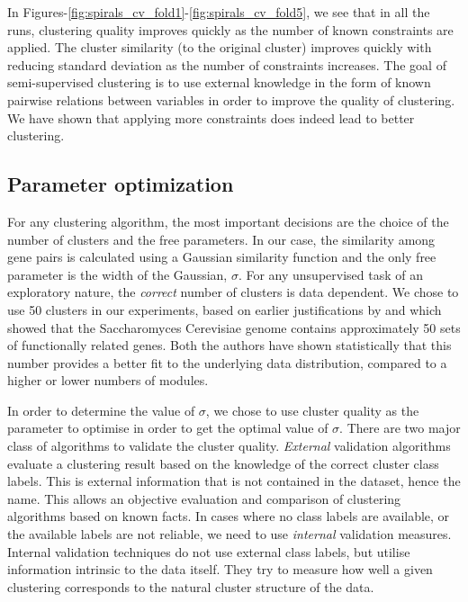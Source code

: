 In Figures-\ref{fig:spirals_cv_fold1}-\ref{fig:spirals_cv_fold5}, we see that in all the runs, clustering quality improves quickly as the number of known constraints are applied. 
The cluster similarity (to the original cluster) improves quickly with reducing standard deviation as the number of constraints increases. The goal of 
semi-supervised clustering is to use external knowledge in the form of known pairwise relations between variables 
in order to improve the quality of clustering. We have shown that applying more constraints does indeed lead to better clustering.

\subsection{Parameter optimization} \label{chap2:sec:param_opt}
For any clustering algorithm, the most important decisions are the choice of the number of clusters and the free parameters. In our case, the similarity among gene pairs is calculated using a Gaussian similarity function and the only free parameter is the width of the Gaussian, $\sigma$. For any unsupervised task of an exploratory nature, the \textit{correct} number of clusters is data dependent. We chose to use 50 clusters in our experiments, based on earlier justifications by \citet{ihmels02revealing} and \citet{segal03module} which showed that the Saccharomyces Cerevisiae genome contains approximately 50 sets of functionally related genes. Both the authors have shown statistically that this number provides a better fit to the underlying data distribution, compared to a higher or lower numbers of modules.

In order to determine the value of $\sigma$, we chose to use cluster quality as the parameter to optimise in order to get the optimal value of $\sigma$. There are two major class of algorithms 
to validate the cluster quality. \textit{External} validation algorithms evaluate a clustering result based on the knowledge of the correct 
cluster class labels. This is external information that is not contained in the dataset, hence the name. This allows an objective evaluation and comparison of clustering algorithms based on known facts. In cases where no class labels are available, or the available labels are not reliable, 
we need to use \textit{internal} validation measures. Internal validation techniques do not use external class labels, but utilise information intrinsic to the data itself. They try to measure how well a given clustering corresponds to the natural cluster structure of the data.


